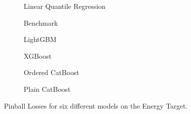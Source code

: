 \begin{figure}[htbp]
    \centering
    \begin{subfigure}[b]{0.5\textwidth}
        \centering
        
        \caption{Linear Quantile Regression}
        \label{fig:small-orfe-pinball-energy}
    \end{subfigure}%
    \begin{subfigure}[b]{0.5\textwidth}
        \centering
        
        \caption{Benchmark}
        \label{fig:armed-play-pinball-energy}
    \end{subfigure}
    
    \begin{subfigure}[b]{0.5\textwidth}
        \centering
        
        \caption{LightGBM}
        \label{fig:mangy-flux-pinball-energy}
    \end{subfigure}%
    \begin{subfigure}[b]{0.5\textwidth}
        \centering
        
        \caption{XGBoost}
        \label{fig:couth-ruby-pinball-energy}
    \end{subfigure}
    
    \begin{subfigure}[b]{0.5\textwidth}
        \centering
        
        \caption{Ordered CatBoost}
        \label{fig:civil-leas-pinball-energy}
    \end{subfigure}%
    \begin{subfigure}[b]{0.5\textwidth}
        \centering
        
        \caption{Plain CatBoost}
        \label{fig:blear-dita-pinball-energy}
    \end{subfigure}
    
    \caption{Pinball Losses for six different models on the Energy Target.}
    \label{fig:energy_pinball}
\end{figure}


